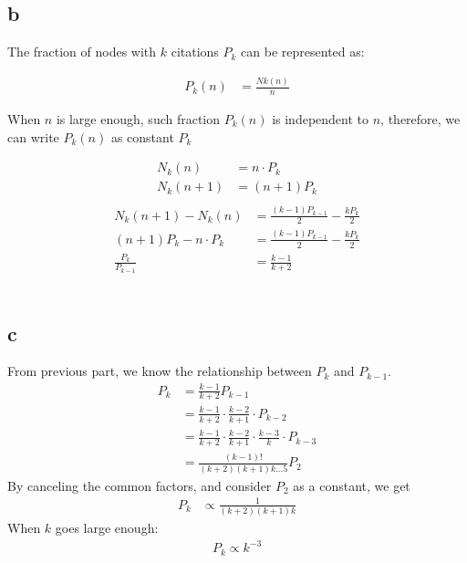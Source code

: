 \documentclass[11pt,letterpaper]{article}
\begin{document}
\subsection*{b}
\noindent The fraction of nodes with $k$ citations $P_k$ can be represented as:

\begin{align*}
P_k(n) &= \frac{Nk(n)}{n}
\end{align*}

\noindent When $n$ is large enough, such fraction $P_k(n)$ is independent to $n$, therefore, we can write $P_k(n)$ as constant $P_k$

\begin{align*}
N_k(n) &= n \cdot P_k \\
N_k(n + 1) &= (n + 1) P_k \\
\end{align*}
\begin{align*}
N_k(n + 1) - N_k(n) &= \frac{(k - 1) P_{k - 1}}{2} - \frac{k P_{k}}{2} \\
(n + 1) P_k - n \cdot P_k &= \frac{(k - 1) P_{k - 1}}{2} - \frac{k P_{k}}{2} \\
\frac{P_k}{P_{k-1}} &= \frac{k-1}{k+2}
\end{align*} \\

\subsection*{c}
\noindent From previous part, we know the relationship between $P_k$ and $P_{k-1}$.
\begin{align*}
P_k &= \frac{k-1}{k+2} P_{k-1} \\
&= \frac{k-1}{k+2} \cdot  \frac{k-2}{k+1} \cdot  P_{k-2} \\
&= \frac{k-1}{k+2} \cdot \frac{k-2}{k+1} \cdot \frac{k-3}{k} \cdot P_{k-3} \\
&= \frac{(k - 1) !}{(k + 2)(k + 1)k ... 5} P_2
\end{align*}
\noindent By canceling the common factors, and consider $P_2$ as a constant, we get
\begin{align*}
P_k &\propto\frac{1}{(k+2) (k+1) k}
\end{align*}
\noindent When $k$ goes large enough:
\begin{align*}
P_k \propto k^{-3}
\end{align*}
\end{document}
